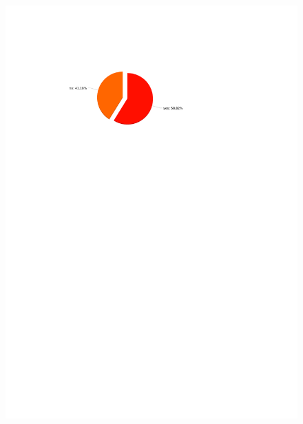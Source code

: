 \begin{figure}[H]
	\centering
	\includegraphics[width=0.6\linewidth]{gfx/Chapter_EvaluationResults/ALFTask/question4}
\end{figure}

